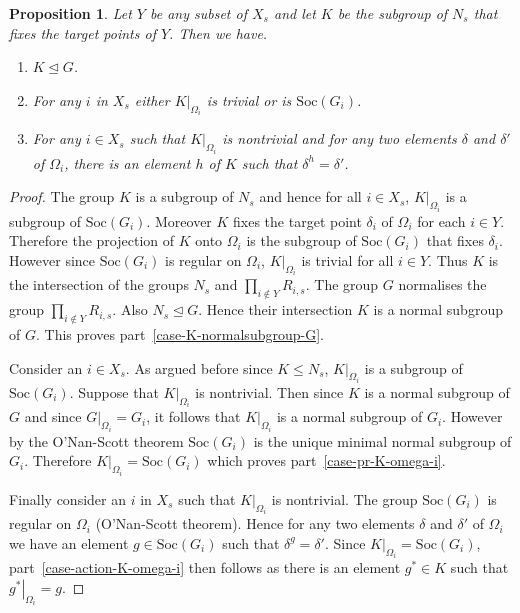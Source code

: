 \documentclass[11pt]{madras}%
\newtheorem{proposition}[theorem]{Proposition}
\theoremstyle{remark}
\newcommand{\pr}[2]{{\ensuremath{\left.{#1}\right\vert_{#2}}}}
\newcommand{\Soc}[1]{{\ensuremath{\mathrm{Soc}\left(#1\right)}}}
\begin{document}
\begin{proposition}\label{prop-K-property}
  Let $Y$ be any subset of $X_s$ and let $K$ be the subgroup of $N_s$
  that fixes the target points of $Y$. Then we have.
  \begin{enumerate}
  \item $K \unlhd G$. \label{case-K-normalsubgroup-G}
  \item For any $i$ in $X_s$ either $\pr{K}{\Omega_i}$ is trivial or
    is $\Soc{G_i}$. \label{case-pr-K-omega-i}
  \item For any $i \in X_s$ such that $\pr{K}{\Omega_i}$ is nontrivial
    and for any two elements $\delta$ and $\delta'$ of $\Omega_i$,
    there is an element $h$ of $K$ such that $\delta^h = \delta'$.
    \label{case-action-K-omega-i}
  \end{enumerate}
\end{proposition}
\begin{proof}
  The group $K$ is a subgroup of $N_s$ and hence for all $i \in X_s$,
  $\pr{K}{\Omega_i}$ is a subgroup of $\Soc{G_i}$. Moreover $K$ fixes
  the target point $\delta_i$ of $\Omega_i$ for each $i \in Y$.
  Therefore the projection of $K$ onto $\Omega_i$ is the subgroup of
  $\Soc{G_i}$ that fixes $\delta_i$. However since $\Soc{G_i}$ is
  regular on $\Omega_i$, $\pr{K}{\Omega_i}$ is trivial for all $i \in
  Y$.  Thus $K$ is the intersection of the groups $N_s$ and $\prod_{i
    \not \in Y} R_{i,s}$.  The group $G$ normalises the group
  $\prod_{i \not \in Y} R_{i,s}$. Also $N_s \unlhd G$. Hence their
  intersection $K$ is a normal subgroup of $G$. This proves
  part~\ref{case-K-normalsubgroup-G}.

  Consider an $i \in X_s$. As argued before since $K \leq N_s$,
  $\pr{K}{\Omega_i}$ is a subgroup of $\Soc{G_i}$. Suppose that
  $\pr{K}{\Omega_i}$ is nontrivial. Then since $K$ is a normal
  subgroup of $G$ and since $\pr{G}{\Omega_i} = G_i$, it follows that
  $\pr{K}{\Omega_i}$ is a normal subgroup of $G_i$. However by the
  O'Nan-Scott theorem $\Soc{G_i}$ is the unique minimal normal
  subgroup of $G_i$.  Therefore $\pr{K}{\Omega_i} = \Soc{G_i}$ which
  proves part~\ref{case-pr-K-omega-i}.

  Finally consider an $i$ in $X_s$ such that $\pr{K}{\Omega_i}$ is
  nontrivial. The group $\Soc{G_i}$ is regular on $\Omega_i$
  (O'Nan-Scott theorem). Hence for any two elements $\delta$ and
  $\delta'$ of $\Omega_i$ we have an element $g \in \Soc{G_i}$ such
  that $\delta^g = \delta'$. Since $\pr{K}{\Omega_i} = \Soc{G_i}$,
  part~\ref{case-action-K-omega-i} then follows as there is an element
  $g^* \in K$ such that $\pr{g^*}{\Omega_i} = g$.
\end{proof}
\end{document}
